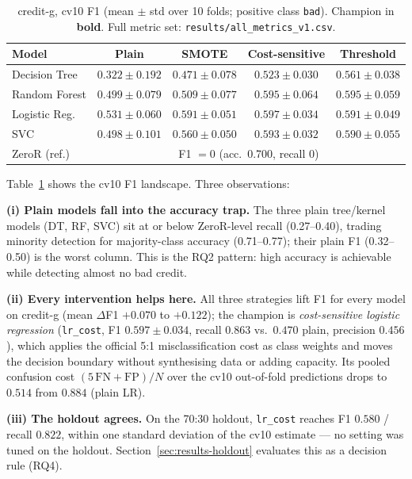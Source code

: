 \begin{table}[H]
\centering
\caption{credit-g, cv10 F1 (mean $\pm$ std over 10 folds; positive class \texttt{bad}). Champion in \textbf{bold}. Full metric set: \texttt{results/all\_metrics\_v1.csv}.}
\label{tab:creditg-f1}
\begin{tabular}{lcccc}
\toprule
Model & Plain & SMOTE & Cost-sensitive & Threshold \\
\midrule
Decision Tree & $0.322\pm0.192$ & $0.471\pm0.078$ & $0.523\pm0.030$ & $0.561\pm0.038$ \\
Random Forest & $0.499\pm0.079$ & $0.509\pm0.077$ & $0.595\pm0.064$ & $0.595\pm0.059$ \\
Logistic Reg. & $0.531\pm0.060$ & $0.591\pm0.051$ & $\mathbf{0.597\pm0.034}$ & $0.591\pm0.049$ \\
SVC & $0.498\pm0.101$ & $0.560\pm0.050$ & $0.593\pm0.032$ & $0.590\pm0.055$ \\
\midrule
ZeroR (ref.) & \multicolumn{4}{c}{F1 $=0$ (acc.\ 0.700, recall 0)} \\
\bottomrule
\end{tabular}
\end{table}

Table~\ref{tab:creditg-f1} shows the cv10 F1 landscape. Three observations:

\textbf{(i) Plain models fall into the accuracy trap.} The three plain tree/kernel models (DT, RF, SVC) sit at or below ZeroR-level recall (0.27--0.40), trading minority detection for majority-class accuracy (0.71--0.77); their plain F1 (0.32--0.50) is the worst column. This is the RQ2 pattern: high accuracy is achievable while detecting almost no bad credit.

\textbf{(ii) Every intervention helps here.} All three strategies lift F1 for every model on credit-g (mean $\Delta$F1 $+0.070$ to $+0.122$); the champion is \emph{cost-sensitive logistic regression} (\texttt{lr\_cost}, F1 $0.597\pm0.034$, recall $0.863$ vs.\ $0.470$ plain, precision $0.456$), which applies the official 5:1 misclassification cost as class weights and moves the decision boundary without synthesising data or adding capacity. Its pooled confusion cost $(5\,\mathrm{FN}+\mathrm{FP})/N$ over the cv10 out-of-fold predictions drops to $0.514$ from $0.884$ (plain LR).

\textbf{(iii) The holdout agrees.} On the 70:30 holdout, \texttt{lr\_cost} reaches F1 $0.580$ / recall $0.822$, within one standard deviation of the cv10 estimate --- no setting was tuned on the holdout. Section~\ref{sec:results-holdout} evaluates this as a decision rule (RQ4).

